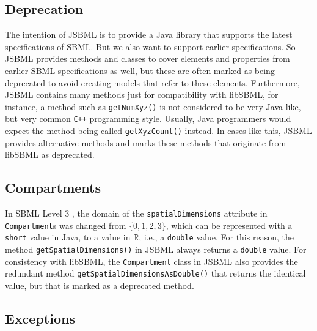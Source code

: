 \subsection{Deprecation}

The intention of JSBML is to provide a Java library
that supports the latest specifications of SBML.
%
%
But we also want to support earlier specifications. So JSBML provides methods
and classes to cover elements and properties from earlier SBML specifications as
well, but these are often marked as being deprecated to avoid creating models
that refer to these elements. Furthermore, JSBML contains many methods just for
compatibility with libSBML, for instance, a method such as \texttt{getNumXyz()}
is not considered to be very Java-like, but very common
\texttt{C++} programming style. Usually, Java
programmers would expect the method being called \texttt{getXyzCount()}
instead. In cases like this, JSBML provides alternative methods and marks these
methods that originate from libSBML as deprecated.


\subsection{Compartments}

In SBML Level 3
%
\citep{Hucka2010a}, the domain of the \texttt{spatialDimensions} attribute in
\texttt{Compartment}s was changed from $\lbrace 0, 1, 2, 3\rbrace$, which can be
represented with a \texttt{short} value in Java, to a value in $\mathbb{R}$,
i.e., a \texttt{double} value. For this reason, the method
\texttt{getSpatialDimensions()} in JSBML
always returns a \texttt{double} value. For consistency with libSBML, the
\texttt{Compartment} class in JSBML also provides the redundant method
\texttt{getSpatialDimensionsAsDouble()} that returns the identical value, but
that is marked as a deprecated method.
%
%
%


\subsection{Exceptions}

